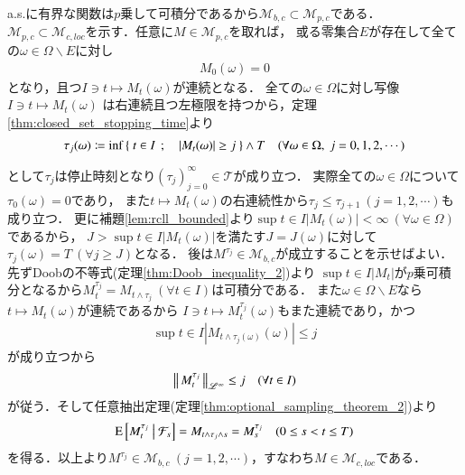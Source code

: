 	\begin{prf}
		a.s.に有界な関数は$p$乗して可積分であるから$\mathcal{M}_{b,c} \subset \mathcal{M}_{p,c}$である．
		$\mathcal{M}_{p,c} \subset \mathcal{M}_{c,loc}$を示す．任意に$M \in \mathcal{M}_{p,c}$を取れば，
		或る零集合$E$が存在して全ての$\omega \in \Omega \backslash E$に対し
		\begin{align}
			M_0(\omega) = 0
		\end{align}
		となり，且つ$I \ni t \longmapsto M_t(\omega)$が連続となる．
		全ての$\omega \in \Omega$に対し写像$I \ni t \longmapsto M_t(\omega)$
		は右連続且つ左極限を持つから，定理\ref{thm:closed_set_stopping_time}より
		\begin{align}
			\tau_j(\omega) \coloneqq \operatorname*{inf}_{} \left\{\ t \in I\ \, ; \quad |M_t(\omega)| \geq j\ \right\} \wedge T \quad (\forall \omega \in \Omega,\ j=0,1,2,\cdots)
		\end{align}
		として$\tau_j$は停止時刻となり$(\tau_j)_{j=0}^{\infty} \in \mathcal{T}$が成り立つ．
		実際全ての$\omega \in \Omega$について$\tau_0(\omega) = 0$であり，
		また$t \longmapsto M_t(\omega)$の右連続性から$\tau_j \leq \tau_{j+1}\ (j=1,2,\cdots)$も成り立つ．
		更に補題\ref{lem:rcll_bounded}より$\sup{t \in I}{|M_t(\omega)|} < \infty\ (\forall \omega \in \Omega)$であるから，
		$J > \sup{t \in I}{|M_t(\omega)|}$を満たす$J = J(\omega)$に対して$\tau_j(\omega) = T\ (\forall j \geq J)$となる．
		後は$M^{\tau_j} \in \mathcal{M}_{b,c}$が成立することを示せばよい．先ずDoobの不等式(定理\ref{thm:Doob_inequality_2})より
		$\sup{t \in I}{|M_t|}$が$p$乗可積分となるから$M_t^{\tau_j} = M_{t \wedge \tau_j}\ (\forall t \in I)$は可積分である．
		また$\omega \in \Omega \backslash E$なら$t \longmapsto M_t(\omega)$が連続であるから
		$I \ni t \longmapsto M_t^{\tau_j}(\omega)$もまた連続であり，かつ
		\begin{align}
			\sup{t \in I}{\left| M_{t \wedge \tau_j(\omega)}(\omega) \right|} \leq j
			\label{eq:M_pc_M_cloc}
		\end{align}
		が成り立つから
		\begin{align}
			\left\|\, M_t^{\tau_j}\, \right\|_{\mathscr{L}^\infty} \leq j \quad (\forall t \in I)
		\end{align}
		が従う．そして任意抽出定理(定理\ref{thm:optional_sampling_theorem_2})より
		\begin{align}
			\operatorname{E} \left[ M_t^{\tau_j} \ \middle|\ \mathcal{F}_s \right] = M_{t \wedge \tau_j \wedge s} = M_s^{\tau_j} \quad (0 \leq s < t \leq T)
		\end{align}
		を得る．以上より$M^{\tau_j} \in \mathcal{M}_{b,c}\ (j=1,2,\cdots)$，すなわち$M \in \mathcal{M}_{c,loc}$である．
		\QED
	\end{prf}
	
